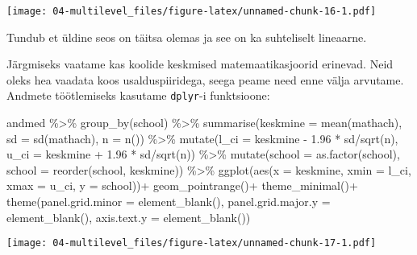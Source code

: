 \documentclass[
]{book}
\newenvironment{Shaded}{\begin{snugshade}}{\end{snugshade}}
\newcommand{\AttributeTok}[1]{\textcolor[rgb]{0.77,0.63,0.00}{#1}}
\newcommand{\FloatTok}[1]{\textcolor[rgb]{0.00,0.00,0.81}{#1}}
\newcommand{\FunctionTok}[1]{\textcolor[rgb]{0.00,0.00,0.00}{#1}}
\newcommand{\NormalTok}[1]{#1}
\newcommand{\SpecialCharTok}[1]{\textcolor[rgb]{0.00,0.00,0.00}{#1}}
\begin{document}
\texttt{[image: 04-multilevel\_files/figure-latex/unnamed-chunk-16-1.pdf]}

Tundub et üldine seos on täitsa olemas ja see on ka suhteliselt lineaarne.

Järgmiseks vaatame kas koolide keskmised matemaatikasjoorid erinevad. Neid oleks hea vaadata koos usalduspiiridega, seega peame need enne välja arvutame. Andmete töötlemiseks kasutame \texttt{dplyr}-i funktsioone:

\begin{Shaded}
\begin{Highlighting}[]
\NormalTok{andmed }\SpecialCharTok{\%\textgreater{}\%} 
  \FunctionTok{group\_by}\NormalTok{(school) }\SpecialCharTok{\%\textgreater{}\%}
  \FunctionTok{summarise}\NormalTok{(}\AttributeTok{keskmine =} \FunctionTok{mean}\NormalTok{(mathach), }
            \AttributeTok{sd =} \FunctionTok{sd}\NormalTok{(mathach), }
            \AttributeTok{n =} \FunctionTok{n}\NormalTok{()) }\SpecialCharTok{\%\textgreater{}\%} 
  \FunctionTok{mutate}\NormalTok{(}\AttributeTok{l\_ci =}\NormalTok{ keskmine }\SpecialCharTok{{-}} \FloatTok{1.96} \SpecialCharTok{*}\NormalTok{ sd}\SpecialCharTok{/}\FunctionTok{sqrt}\NormalTok{(n),}
         \AttributeTok{u\_ci =}\NormalTok{ keskmine }\SpecialCharTok{+} \FloatTok{1.96} \SpecialCharTok{*}\NormalTok{ sd}\SpecialCharTok{/}\FunctionTok{sqrt}\NormalTok{(n)) }\SpecialCharTok{\%\textgreater{}\%}
  \FunctionTok{mutate}\NormalTok{(}\AttributeTok{school =} \FunctionTok{as.factor}\NormalTok{(school),}
         \AttributeTok{school =} \FunctionTok{reorder}\NormalTok{(school, keskmine)) }\SpecialCharTok{\%\textgreater{}\%} 
  \FunctionTok{ggplot}\NormalTok{(}\FunctionTok{aes}\NormalTok{(}\AttributeTok{x =}\NormalTok{ keskmine, }
             \AttributeTok{xmin =}\NormalTok{ l\_ci, }
             \AttributeTok{xmax =}\NormalTok{ u\_ci, }
             \AttributeTok{y =}\NormalTok{ school))}\SpecialCharTok{+}
  \FunctionTok{geom\_pointrange}\NormalTok{()}\SpecialCharTok{+}
  \FunctionTok{theme\_minimal}\NormalTok{()}\SpecialCharTok{+}
  \FunctionTok{theme}\NormalTok{(}\AttributeTok{panel.grid.minor =} \FunctionTok{element\_blank}\NormalTok{(),}
        \AttributeTok{panel.grid.major.y =} \FunctionTok{element\_blank}\NormalTok{(),}
        \AttributeTok{axis.text.y =} \FunctionTok{element\_blank}\NormalTok{())}
\end{Highlighting}
\end{Shaded}

\texttt{[image: 04-multilevel\_files/figure-latex/unnamed-chunk-17-1.pdf]}
\end{document}
